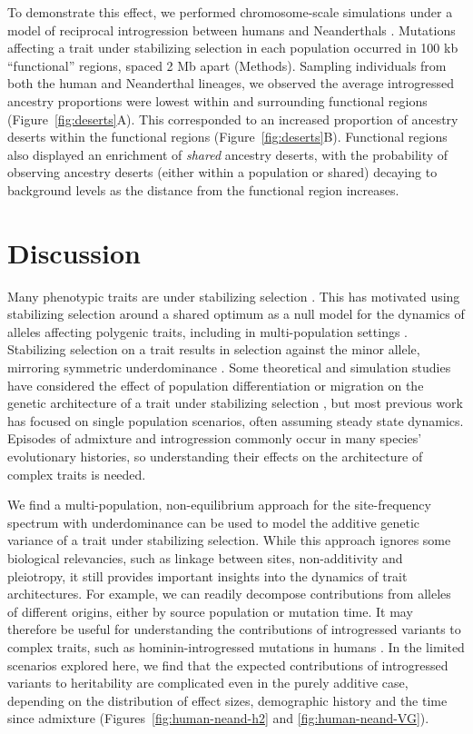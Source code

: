 \documentclass{article}
\begin{document}
To demonstrate this effect, we performed chromosome-scale simulations under a
model of reciprocal introgression between humans and Neanderthals
\citep[Figure~\ref{fig:human-neand-h2}A,][]{harris2023diverse}. Mutations
affecting a trait under stabilizing selection in each population occurred in
100 kb ``functional'' regions, spaced 2 Mb apart (Methods). Sampling
individuals from both the human and Neanderthal lineages, we observed the
average introgressed ancestry proportions were lowest within and surrounding
functional regions (Figure~\ref{fig:deserts}A). This corresponded to an
increased proportion of ancestry deserts within the functional regions
(Figure~\ref{fig:deserts}B). Functional regions also displayed an enrichment
of \emph{shared} ancestry deserts, with the probability of observing ancestry
deserts (either within a population or shared) decaying to background levels as
the distance from the functional region increases.

\section*{Discussion}

Many phenotypic traits are under stabilizing selection \citep{hodgins2015gene,
sanjak2018evidence, sella2019thinking}. This has motivated using stabilizing
selection around a shared optimum as a null model for the dynamics of alleles
affecting polygenic traits, including in multi-population settings
\citep{yair2022population}. Stabilizing selection on a trait results in
selection against the minor allele, mirroring symmetric underdominance
\citep{robertson1956effect, keightley1988quantitative}. Some theoretical and
simulation studies have considered the effect of population differentiation or
migration on the genetic architecture of a trait under stabilizing selection
\citep[e.g.,][]{tufto2000quantitative, yeaman2011genetic, yair2022population},
but most previous work has focused on single population scenarios, often
assuming steady state dynamics. Episodes of admixture and introgression
commonly occur in many species' evolutionary histories, so understanding their
effects on the architecture of complex traits is needed.

We find a multi-population, non-equilibrium approach for the site-frequency
spectrum with underdominance can be used to model the additive genetic variance
of a trait under stabilizing selection. While this approach ignores some
biological relevancies, such as linkage between sites, non-additivity and
pleiotropy, it still provides important insights into the dynamics of trait
architectures. For example, we can readily decompose contributions from alleles
of different origins, either by source population or mutation time. It may
therefore be useful for understanding the contributions of introgressed
variants to complex traits, such as hominin-introgressed mutations in humans
\citep{reilly2022contribution, wei2023lingering}. In the limited scenarios
explored here, we find that the expected contributions of introgressed variants
to heritability are complicated even in the purely additive case, depending on
the distribution of effect sizes, demographic history and the time since
admixture (Figures~\ref{fig:human-neand-h2} and \ref{fig:human-neand-VG}).
\end{document}
